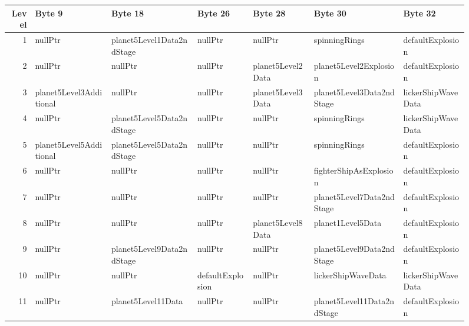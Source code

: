 \begin{figure}[H]
  {
    \setlength{\tabcolsep}{3.0pt}
    \setlength\cmidrulewidth{\heavyrulewidth} %
    \begin{adjustbox}{width=\textwidth}

      \begin{tabular}{rllllll}
        \toprule
        Level & Byte 9                  & Byte 18                   & Byte 26           & Byte 28            & Byte 30                    & Byte 32            \\
        \midrule
        1 & nullPtr                 & planet5Level1Data2ndStage & nullPtr           & nullPtr            & spinningRings              & defaultExplosion   \\
        2 & nullPtr                 & nullPtr                   & nullPtr           & planet5Level2Data  & planet5Level2Explosion     & defaultExplosion   \\
        3 & planet5Level3Additional & nullPtr                   & nullPtr           & planet5Level3Data  & planet5Level3Data2ndStage  & lickerShipWaveData \\
        4 & nullPtr                 & planet5Level5Data2ndStage & nullPtr           & nullPtr            & spinningRings              & lickerShipWaveData \\
        5 & planet5Level5Additional & planet5Level5Data2ndStage & nullPtr           & nullPtr            & spinningRings              & defaultExplosion   \\
        6 & nullPtr                 & nullPtr                   & nullPtr           & nullPtr            & fighterShipAsExplosion     & defaultExplosion   \\
        7 & nullPtr                 & nullPtr                   & nullPtr           & nullPtr            & planet5Level7Data2ndStage  & defaultExplosion   \\
        8 & nullPtr                 & nullPtr                   & nullPtr           & planet5Level8Data  & planet1Level5Data          & defaultExplosion   \\
        9 & nullPtr                 & planet5Level9Data2ndStage & nullPtr           & nullPtr            & planet5Level9Data2ndStage  & defaultExplosion   \\
        10 & nullPtr                 & nullPtr                   & defaultExplosion  & nullPtr            & lickerShipWaveData         & lickerShipWaveData \\
        11 & nullPtr                 & planet5Level11Data        & nullPtr           & nullPtr            & planet5Level11Data2ndStage & defaultExplosion   \\

\end{tabular}
\end{adjustbox}}
\end{figure}
